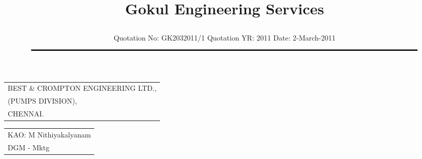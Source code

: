 \documentclass[11pt]{article}
\title{\vspace*{1cm} \centerline{ \Huge { \bf \hspace{0cm} Gokul Engineering Services}\vspace*{-0.5cm}}}
\author{%
 \scriptsize Quotation No: GK2032011/1  \hspace*{4cm}  Quotation YR: 2011 \hspace*{4cm} Date:  2-March-2011\\
$\rule{7.5in}{0.5mm}$}
\date{}
\begin{document}
\maketitle
\thispagestyle{empty}
\vspace*{0cm}	
\begin{flushleft}
{\footnotesize{
\begin{tabular}{l}
BEST \& CROMPTON ENGINEERING LTD.,\\
(PUMPS DIVISION),\\
CHENNAI.\\
\end{tabular}
}}
\end{flushleft}

\vspace*{-1cm}
\vspace*{-20pt}

\begin{flushright}
\begin{tabular}{l}
 KAO: M Nithiyakalyanam \\
 DGM - Mktg
\end{tabular}
\end{flushright}
\vspace{1cm}

\end{document}
